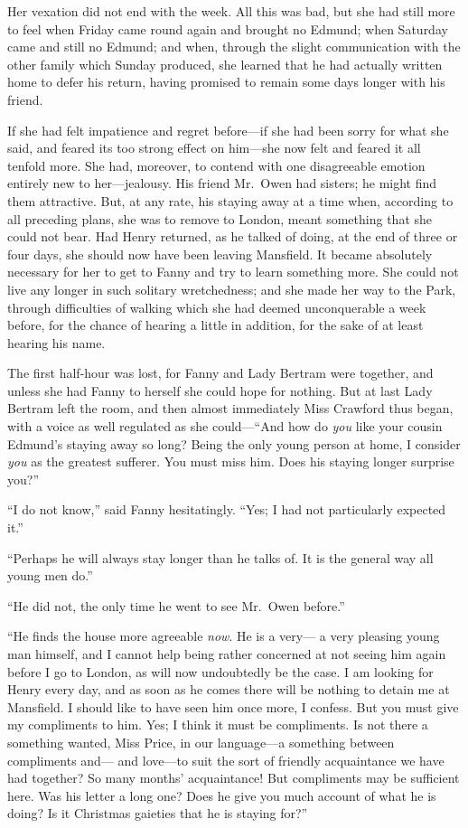 \documentclass{article}
\begin{document}
Her vexation did not end with the week.  All this was bad,
but she had still more to feel when Friday came round
again and brought no Edmund; when Saturday came and still
no Edmund; and when, through the slight communication
with the other family which Sunday produced, she learned
that he had actually written home to defer his return,
having promised to remain some days longer with his friend.

If she had felt impatience and regret before---if she had
been sorry for what she said, and feared its too strong
effect on him---she now felt and feared it all tenfold more.
She had, moreover, to contend with one disagreeable emotion
entirely new to her---jealousy.  His friend Mr.\ Owen had sisters;
he might find them attractive.  But, at any rate, his staying
away at a time when, according to all preceding plans,
she was to remove to London, meant something that she could
not bear.  Had Henry returned, as he talked of doing,
at the end of three or four days, she should now have
been leaving Mansfield.  It became absolutely necessary
for her to get to Fanny and try to learn something more.
She could not live any longer in such solitary wretchedness;
and she made her way to the Park, through difficulties
of walking which she had deemed unconquerable a week before,
for the chance of hearing a little in addition, for the
sake of at least hearing his name.

The first half-hour was lost, for Fanny and Lady Bertram
were together, and unless she had Fanny to herself she could
hope for nothing.  But at last Lady Bertram left the room,
and then almost immediately Miss Crawford thus began,
with a voice as well regulated as she could---``And how do
\emph{you} like your cousin Edmund's staying away so long?
Being the only young person at home, I consider \emph{you}
as the greatest sufferer.  You must miss him.  Does his
staying longer surprise you?''

``I do not know,'' said Fanny hesitatingly.  ``Yes; I had
not particularly expected it.''

``Perhaps he will always stay longer than he talks of.
It is the general way all young men do.''

``He did not, the only time he went to see Mr.\ Owen before.''

``He finds the house more agreeable \emph{now}. He is a very---%
a very pleasing young man himself, and I cannot help
being rather concerned at not seeing him again before I
go to London, as will now undoubtedly be the case.
I am looking for Henry every day, and as soon as he
comes there will be nothing to detain me at Mansfield.
I should like to have seen him once more, I confess.
But you must give my compliments to him.  Yes; I think it must
be compliments.  Is not there a something wanted, Miss Price,
in our language---a something between compliments and---%
and love---to suit the sort of friendly acquaintance we have
had together?  So many months' acquaintance!  But compliments
may be sufficient here.  Was his letter a long one?
Does he give you much account of what he is doing?
Is it Christmas gaieties that he is staying for?''
\end{document}
